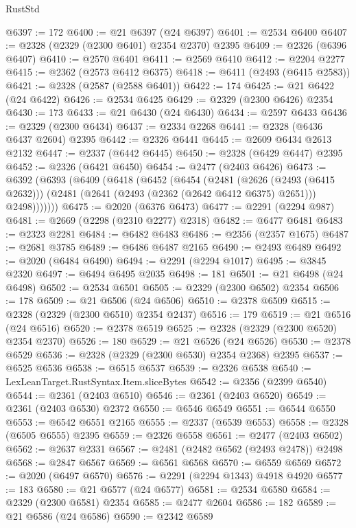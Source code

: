 \begin{lexlean}{RustStd}
\begin{coremodule}
@6397 := 172
@6400 := @21 @6397 (@24 @6397)
@6401 := @2534 @6400
@6407 := @2328 (@2329 (@2300 @6401) @2354 @2370) @2395
@6409 := @2326 (@6396 @6407)
@6410 := @2570 @6401
@6411 := @2569 @6410
@6412 := @2204 @2277
@6415 := @2362 (@2573 @6412 @6375)
@6418 := @6411 (@2493 (@6415 @2583))
@6421 := @2328 (@2587 (@2588 @6401))
@6422 := 174
@6425 := @21 @6422 (@24 @6422)
@6426 := @2534 @6425
@6429 := @2329 (@2300 @6426) @2354
@6430 := 173
@6433 := @21 @6430 (@24 @6430)
@6434 := @2597 @6433
@6436 := @2329 (@2300 @6434)
@6437 := @2334 @2268
@6441 := @2328 (@6436 @6437 @2604) @2395
@6442 := @2326 @6441
@6445 := @2609 @6434 @2613 @2132
@6447 := @2337 (@6442 @6445)
@6450 := @2328 (@6429 @6447) @2395
@6452 := @2326 (@6421 @6450)
@6454 := @2477 (@2403 @6426)
@6473 := @6392
    (@6393
      (@6409
        (@6418
          (@6452
            (@6454
              (@2481
                (@2626 (@2493 (@6415 @2632)))
                (@2481 (@2641 (@2493 (@2362 (@2642 @6412 @6375) @2651))) @2498)))))))
@6475 := @2020 (@6376 @6473)
@6477 := @2291 (@2294 @987)
@6481 := @2669 (@2298 (@2310 @2277) @2318)
@6482 := @6477 @6481
@6483 := @2323 @2281
@6484 := @6482 @6483
@6486 := @2356 (@2357 @1675)
@6487 := @2681 @3785
@6489 := @6486 @6487 @2165
@6490 := @2493 @6489
@6492 := @2020 (@6484 @6490)
@6494 := @2291 (@2294 @1017)
@6495 := @3845 @2320
@6497 := @6494 @6495 @2035
@6498 := 181
@6501 := @21 @6498 (@24 @6498)
@6502 := @2534 @6501
@6505 := @2329 (@2300 @6502) @2354
@6506 := 178
@6509 := @21 @6506 (@24 @6506)
@6510 := @2378 @6509
@6515 := @2328 (@2329 (@2300 @6510) @2354 @2437)
@6516 := 179
@6519 := @21 @6516 (@24 @6516)
@6520 := @2378 @6519
@6525 := @2328 (@2329 (@2300 @6520) @2354 @2370)
@6526 := 180
@6529 := @21 @6526 (@24 @6526)
@6530 := @2378 @6529
@6536 := @2328 (@2329 (@2300 @6530) @2354 @2368) @2395
@6537 := @6525 @6536
@6538 := @6515 @6537
@6539 := @2326 @6538
@6540 := LexLeanTarget.RustSyntax.Item.sliceBytes
@6542 := @2356 (@2399 @6540)
@6544 := @2361 (@2403 @6510)
@6546 := @2361 (@2403 @6520)
@6549 := @2361 (@2403 @6530) @2372
@6550 := @6546 @6549
@6551 := @6544 @6550
@6553 := @6542 @6551 @2165
@6555 := @2337 (@6539 @6553)
@6558 := @2328 (@6505 @6555) @2395
@6559 := @2326 @6558
@6561 := @2477 (@2403 @6502)
@6562 := @2637 @2331
@6567 := @2481 (@2482 @6562 (@2493 @2478)) @2498
@6568 := @2847 @6567
@6569 := @6561 @6568
@6570 := @6559 @6569
@6572 := @2020 (@6497 @6570)
@6576 := @2291 (@2294 @1343) @4918 @4920
@6577 := 183
@6580 := @21 @6577 (@24 @6577)
@6581 := @2534 @6580
@6584 := @2329 (@2300 @6581) @2354
@6585 := @2477 @2604
@6586 := 182
@6589 := @21 @6586 (@24 @6586)
@6590 := @2342 @6589

\end{coremodule}
\end{lexlean}
